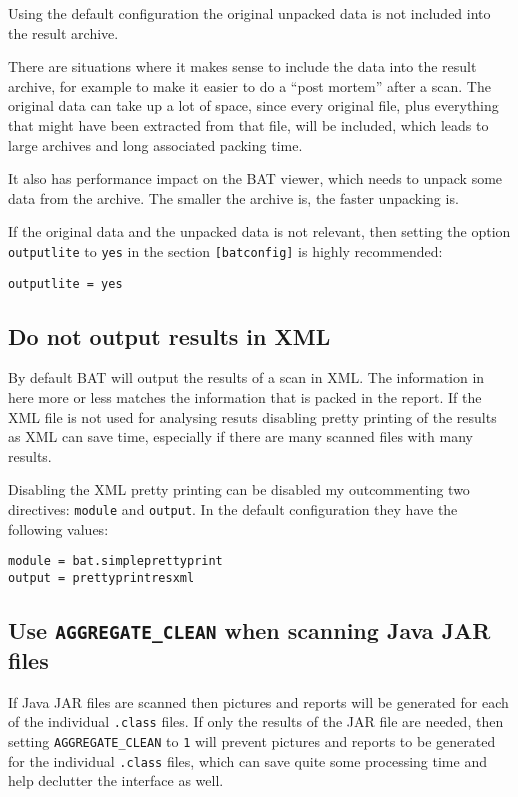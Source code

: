 \documentclass[10pt]{article}
\begin{document}
Using the default configuration the original unpacked data is not included into
the result archive.

There are situations where it makes sense to include the data into the result
archive, for example to make it easier to do a ``post mortem'' after a scan.
The original data can take up a lot of space, since every original file, plus
everything that might have been extracted from that file, will be included,
which leads to large archives and long associated packing time.

It also has performance impact on the BAT viewer, which needs to unpack some
data from the archive. The smaller the archive is, the faster unpacking is.

If the original data and the unpacked data is not relevant, then setting the
option \texttt{outputlite} to \texttt{yes} in the section \texttt{[batconfig]}
is highly recommended:

\begin{verbatim}
outputlite = yes
\end{verbatim}

\subsection{Do not output results in XML}

By default BAT will output the results of a scan in XML. The information in
here more or less matches the information that is packed in the report. If the
XML file is not used for analysing resuts disabling pretty printing of the
results as XML can save time, especially if there are many scanned files with
many results.

Disabling the XML pretty printing can be disabled my outcommenting two
directives: \texttt{module} and \texttt{output}. In the default configuration
they have the following values:

\begin{verbatim}
module = bat.simpleprettyprint
output = prettyprintresxml
\end{verbatim}

\subsection{Use \texttt{AGGREGATE\_CLEAN} when scanning Java JAR files}

If Java JAR files are scanned then pictures and reports will be generated for
each of the individual \texttt{.class} files. If only the results of the JAR
file are needed, then setting \texttt{AGGREGATE\_CLEAN} to \texttt{1} will
prevent pictures and reports to be generated for the individual \texttt{.class}
files, which can save quite some processing time and help declutter the
interface as well.
\end{document}
